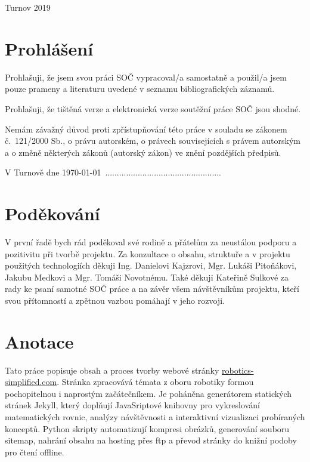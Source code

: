 \documentclass[a4paper, 12pt, twoside]{article}
\begin{document}
  \fontsize{12}{14.4} \selectfont
  Turnov 2019

  \vspace{4em}

  \cleardoublepage

  \section*{\normalfont\textbf{Prohlášení}}
  Prohlašuji, že jsem svou práci SOČ vypracoval/a samostatně a použil/a jsem pouze prameny a literaturu uvedené v seznamu bibliografických záznamů.

  Prohlašuji, že tištěná verze a elektronická verze soutěžní práce SOČ jsou shodné.

  Nemám závažný důvod proti zpřístupňování této práce v souladu se zákonem č.~121/2000 Sb., o právu autorském, o právech souvisejících s právem autorským a o změně některých zákonů (autorský zákon) ve znění pozdějších předpisů.

  \qquad

  V Turnově dne \today \, ..................................................\\%

  \cleardoublepage

  \section*{\normalfont\textbf{Poděkování}}
  V první řadě bych rád poděkoval své rodině a přátelům za neustálou podporu a pozitivitu při tvorbě projektu. Za konzultace o obsahu, struktuře a v projektu použitých technologiích děkuji Ing. Danielovi Kajzrovi, Mgr. Lukáši Pitoňákovi, Jakubu Medkovi a Mgr. Tomáši Novotnému. Také děkuji Kateřině Sulkové za rady ke psaní samotné SOČ práce a na závěr všem návštěvníkům projektu, kteří svou přítomností a zpětnou vazbou pomáhají v jeho rozvoji.

  \cleardoublepage

  \section*{\normalfont\textbf{Anotace}}
  Tato práce popisuje obsah a proces tvorby webové stránky \url{robotics-simplified.com}. Stránka zpracovává témata z oboru robotiky formou pochopitelnou i naprostým začátečníkem. Je poháněna generátorem statických stránek Jekyll, který doplňují JavaSriptové knihovny pro vykreslování matematických rovnic, analýzy návštěvnosti a interaktivní vizualizaci probíraných konceptů. Python skripty automatizují kompresi obrázků, generování souboru sitemap, nahrání obsahu na hosting přes \acrshort{ftp} a převod stránky do knižní podoby pro čtení offline.
\end{document}
